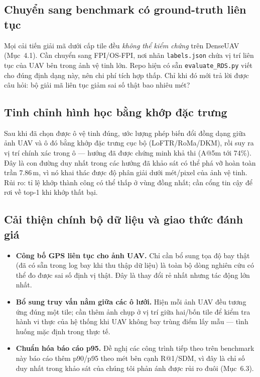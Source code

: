 \documentclass[11pt]{article}
\begin{document}
\subsection{Chuyển sang benchmark có ground-truth liên tục}

Mọi cải tiến giải mã dưới cấp tile đều \emph{không thể kiểm chứng} trên DenseUAV (Mục~4.1). Cần chuyển sang FPI/OS-FPI, nơi nhãn \texttt{labels.json} chứa vị trí liên tục của UAV bên trong ảnh vệ tinh lớn. Repo hiện có sẵn \texttt{evaluate\_RDS.py} viết cho đúng định dạng này, nên chi phí tích hợp thấp. Chỉ khi đó mới trả lời được câu hỏi: bộ giải mã liên tục giảm sai số thật bao nhiêu mét?

\subsection{Tinh chỉnh hình học bằng khớp đặc trưng}

Sau khi đã chọn được ô vệ tinh đúng, ước lượng phép biến đổi đồng dạng giữa ảnh UAV và ô đó bằng khớp đặc trưng cục bộ (LoFTR/RoMa/DKM), rồi suy ra vị trí chính xác trong ô --- hướng đã được \cite{camp2025} chứng minh khả thi (A@5m tới 74\%). Đây là con đường duy nhất trong các hướng đã khảo sát có thể phá vỡ hoàn toàn trần 7.86\,m, vì nó khai thác được độ phân giải dưới mét/pixel của ảnh vệ tinh. Rủi ro: tỉ lệ khớp thành công có thể thấp ở vùng đồng nhất; cần cổng tin cậy để rơi về top-1 khi khớp thất bại.

\subsection{Cải thiện chính bộ dữ liệu và giao thức đánh giá}

\begin{itemize}
  \item \textbf{Công bố GPS liên tục cho ảnh UAV.} Chỉ cần bổ sung tọa độ bay thật (đã có sẵn trong log bay khi thu thập dữ liệu) là toàn bộ dòng nghiên cứu có thể đo được sai số định vị thật. Đây là thay đổi rẻ nhất nhưng tác động lớn nhất.
  \item \textbf{Bổ sung truy vấn nằm giữa các ô lưới.} Hiện mỗi ảnh UAV đều tương ứng đúng một tile; cần thêm ảnh chụp ở vị trí giữa hai/bốn tile để kiểm tra hành vi thực của hệ thống khi UAV không bay trùng điểm lấy mẫu --- tình huống mặc định trong thực tế.
  \item \textbf{Chuẩn hóa báo cáo p95.} Đề nghị các công trình tiếp theo trên benchmark này báo cáo thêm p90/p95 theo mét bên cạnh R@1/SDM, vì đây là chỉ số duy nhất trong khảo sát của chúng tôi phản ánh được rủi ro đuôi (Mục~6.3).
\end{itemize}
\end{document}
